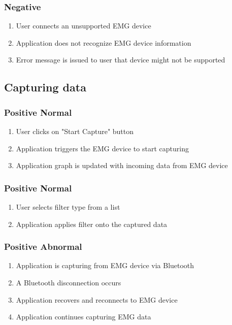 \documentclass[12pt,a4paper]{article}
\begin{document}
\subsubsection{Negative}

\begin{enumerate}
	\item User connects an unsupported EMG device
	\item Application does not recognize EMG device information
	\item Error message is issued to user that device might not be supported
\end{enumerate}

\subsection{Capturing data}

\subsubsection{Positive Normal}

\begin{enumerate}
	\item User clicks on "Start Capture" button
	\item Application triggers the EMG device to start capturing
	\item Application graph is updated with incoming data from EMG device
\end{enumerate}

\subsubsection{Positive Normal}

\begin{enumerate}
	\item User selects filter type from a list
	\item Application applies filter onto the captured data
\end{enumerate}

\subsubsection{Positive Abnormal}

\begin{enumerate}
	\item Application is capturing from EMG device via Bluetooth
	\item A Bluetooth disconnection occurs
	\item Application recovers and reconnects to EMG device
	\item Application continues capturing EMG data
\end{enumerate}
\end{document}
